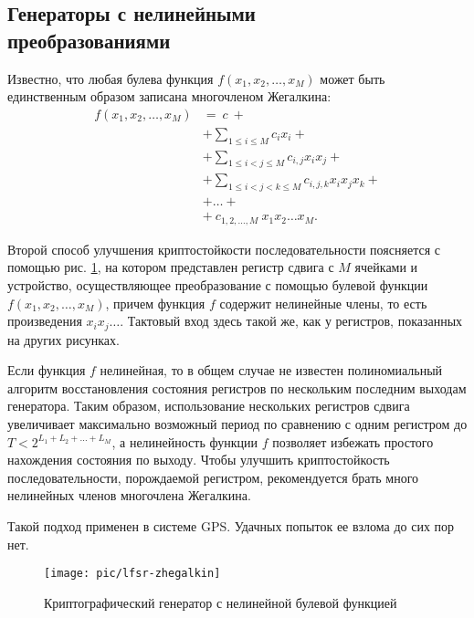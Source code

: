 \subsection[Генераторы с нелинейными преобразованиями]{Генераторы с нелинейными \protect\\ преобразованиями}

Известно, что любая булева функция $f(x_1, x_2,  \dots, x_M)$ может быть единственным образом записана многочленом Жегалкина:
\[ \begin{array}{ll}
    f(x_1, x_2, \dots, x_M) & = ~c~ + \\
    & + \sum\limits_{1 \leq i \leq M} c_i x_i + \\
    & + \sum\limits_{1 \leq i < j \leq M} c_{i,j} x_i x_j + \\
    & + \sum\limits_{1 \leq i < j < k \leq M} c_{i,j,k} x_i x_j x_k + \\
    & + \dots + \\
    & + ~ c_{1,2,\dots,M} ~ x_1 x_2 \dots x_M.
\end{array} \]


Второй способ улучшения криптостойкости последовательности поясняется с помощью рис. \ref{fig:lfsr-zhegalkin}, на котором представлен регистр сдвига с $M$ ячейками и устройство, осуществляющее преобразование с помощью булевой функции $f(x_1, x_2, \dots, x_M)$, причем функция $f$ содержит нелинейные члены, то есть произведения $x_i x_j \dots$. Тактовый вход здесь такой же, как у регистров, показанных на других рисунках.

Если функция $f$ нелинейная, то в общем случае не известен полиномиальный алгоритм восстановления состояния регистров по нескольким последним выходам генератора. Таким образом, использование нескольких регистров сдвига увеличивает максимально возможный период по сравнению с одним регистром до $T < 2^{L_1 + L_2 + \dots + L_M}$, а нелинейность функции $f$ позволяет избежать простого нахождения состояния по выходу. Чтобы улучшить криптостойкость последовательности, порождаемой  регистром, рекомендуется брать много нелинейных членов многочлена Жегалкина.

Такой подход применен в системе GPS. Удачных попыток ее взлома до сих пор нет.

\begin{figure}[h!]
    \centering
	\texttt{[image: pic/lfsr-zhegalkin]}
    \caption{Криптографический генератор с нелинейной булевой функцией\label{fig:lfsr-zhegalkin}}
\end{figure}
